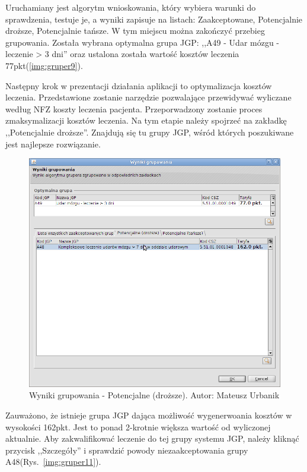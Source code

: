 Uruchamiany jest algorytm wnioskowania, który wybiera warunki do sprawdzenia, testuje je, a wyniki zapisuje na listach: Zaakceptowane, Potencjalnie droższe, Potencjalnie tańsze. W tym miejscu można zakończyć przebieg grupowania. Została wybrana optymalna grupa JGP: ,,A49 - Udar mózgu - leczenie > 3 dni'' oraz ustalona została wartość kosztów leczenia 77pkt(\ref{img:gruper9}).

Następny krok w prezentacji działania aplikacji to optymalizacja kosztów leczenia. Przedstawione zostanie narzędzie pozwalające przewidywać wyliczane według NFZ koszty leczenia pacjenta. Przeporwadzony zostanie proces zmaksymalizacji kosztów leczenia. Na tym etapie należy spojrzeć na zakładkę ,,Potencjalnie droższe''. Znajdują się tu grupy JGP, wśród których poszukiwane jest najlepsze rozwiązanie.

\begin{figure}%
\centering
\includegraphics[scale=0.4]{images/gruper10}
\caption[Widok grupera]{Wyniki grupowania - Potencjalne (droższe). Autor: Mateusz Urbanik}
\label{img:gruper10}
\end{figure}

Zauważono, że istnieje grupa JGP dająca możliwość wygenerwoania kosztów w wysokości 162pkt. Jest to ponad 2-krotnie większa wartość od wyliczonej aktualnie. Aby zakwalifikować leczenie do tej grupy systemu JGP, należy kliknąć przycisk ,,Szczegóły'' i sprawdzić powody niezaakceptowania grupy A48(Rys.~\ref{img:gruper11}).

